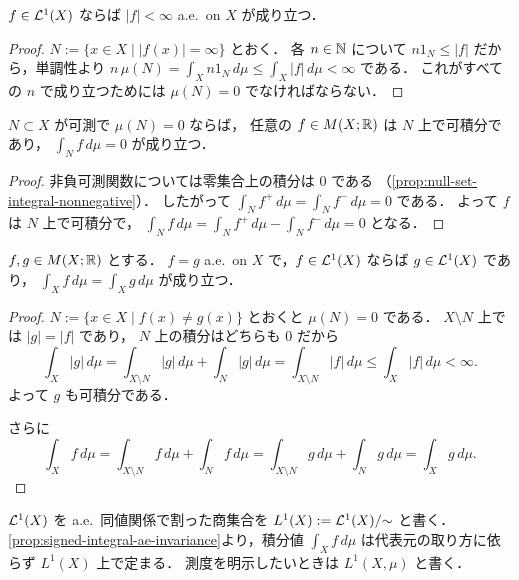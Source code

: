 \begin{corollary}\label{cor:integrable-finite-ae}
$f\in\mathcal L^1(X)$ ならば
$|f|<\infty$ a.e.\ on $X$ が成り立つ．
\end{corollary}
\begin{proof}
$N:=\{x \in X \mid |f(x)|=\infty\}$ とおく．
各 $n \in \mathbb N$ について
$n1_N\le |f|$ だから，単調性より
$n\,\mu(N)=\int_X n1_N\,d\mu \le \int_X |f|\,d\mu<\infty$ である．
これがすべての $n$ で成り立つためには
$\mu(N)=0$ でなければならない．
\end{proof}

\begin{proposition}[零集合上の任意の関数]\label{prop:null-set-integral-signed}
$N \subset X$ が可測で $\mu(N)=0$ ならば，
任意の $f\in M(X;\mathbb R)$ は $N$ 上で可積分であり，
$\int_N f\,d\mu=0$ が成り立つ．
\end{proposition}
\begin{proof}
非負可測関数については零集合上の積分は $0$ である
（\cref{prop:null-set-integral-nonnegative}）．
したがって $\int_N f^+\,d\mu=\int_N f^-\,d\mu=0$ である．
よって $f$ は $N$ 上で可積分で，
$\int_N f\,d\mu=\int_N f^+\,d\mu-\int_N f^-\,d\mu=0$ となる．
\end{proof}

\begin{proposition}\label{prop:signed-integral-ae-invariance}
$f,g\in M(X;\mathbb R)$ とする．
$f=g$ a.e.\ on $X$ で，$f\in\mathcal L^1(X)$ ならば $g\in\mathcal L^1(X)$ であり，
$\int_X f\,d\mu=\int_X g\,d\mu$ が成り立つ．
\end{proposition}
\begin{proof}
$N:=\{x \in X \mid f(x)\ne g(x)\}$ とおくと $\mu(N)=0$ である．
$X\setminus N$ 上では $|g|=|f|$ であり，
$N$ 上の積分はどちらも $0$ だから
\[
\int_X |g|\,d\mu
=\int_{X\setminus N}|g|\,d\mu+\int_N |g|\,d\mu
=\int_{X\setminus N}|f|\,d\mu
\le \int_X |f|\,d\mu<\infty.
\]
よって $g$ も可積分である．

さらに
\[
\int_X f\,d\mu
=\int_{X\setminus N} f\,d\mu+\int_N f\,d\mu
=\int_{X\setminus N} g\,d\mu+\int_N g\,d\mu
=\int_X g\,d\mu.
\]
\end{proof}

\begin{definition}[$L^1$ 空間]\label{def:L1-space}
$\mathcal L^1(X)$ を a.e.\ 同値関係で割った商集合を
$L^1(X):=\mathcal L^1(X)/{\sim}$ と書く．
\cref{prop:signed-integral-ae-invariance}より，積分値 $\int_X f\,d\mu$ は代表元の取り方に依らず $L^1(X)$ 上で定まる．
測度を明示したいときは $L^1(X,\mu)$ と書く．
\end{definition}

